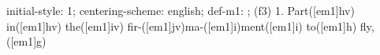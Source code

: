 initial-style: 1;
centering-scheme: english;
def-m1: \grealign;
(f3) 1. Part([em1]hv) in([em1]hv) the([em1]iv) fir-([em1]jv)ma-([em1]i)ment([em1]i) to([em1]h) fly,([em1]g)